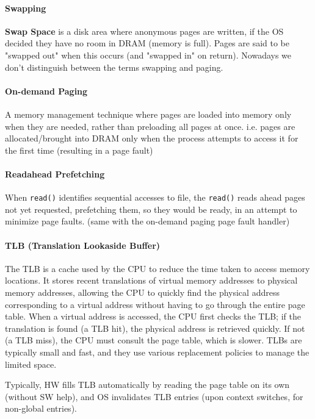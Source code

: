 \documentclass[openany,12pt]{book}
\newcommand{\code}[1]{\texttt{#1}}
\begin{document}
\paragraph{Swapping} \textbf{Swap Space} is a disk area where anonymous pages are written, if the OS decided they have no room in DRAM (memory is full). Pages are said to be "swapped out" when this occurs (and "swapped in" on return). Nowadays we don't distinguish between the terms swapping and paging.


\paragraph{On-demand Paging} A memory management technique where pages are loaded into memory only when they are needed, rather than preloading all pages at once. i.e. pages are allocated/brought into DRAM only when the process attempts to access it for the first time (resulting in a page fault)

\paragraph{Readahead Prefetching} When \code{read()} identifies sequential accesses to file, the \code{read()} reads ahead pages not yet requested, prefetching them, so they would be ready, in an attempt to minimize page faults. (same with the on-demand paging page fault handler)


\paragraph{TLB (Translation Lookaside Buffer)} The TLB is a cache used by the CPU to reduce the time taken to access memory locations. It stores recent translations of virtual memory addresses to physical memory addresses, allowing the CPU to quickly find the physical address corresponding to a virtual address without having to go through the entire page table. When a virtual address is accessed, the CPU first checks the TLB; if the translation is found (a TLB hit), the physical address is retrieved quickly. If not (a TLB miss), the CPU must consult the page table, which is slower. TLBs are typically small and fast, and they use various replacement policies to manage the limited space. 

Typically, HW fills TLB automatically by reading the page table on its own (without SW help), and OS invalidates TLB entries (upon context switches, for non-global entries).
\end{document}
